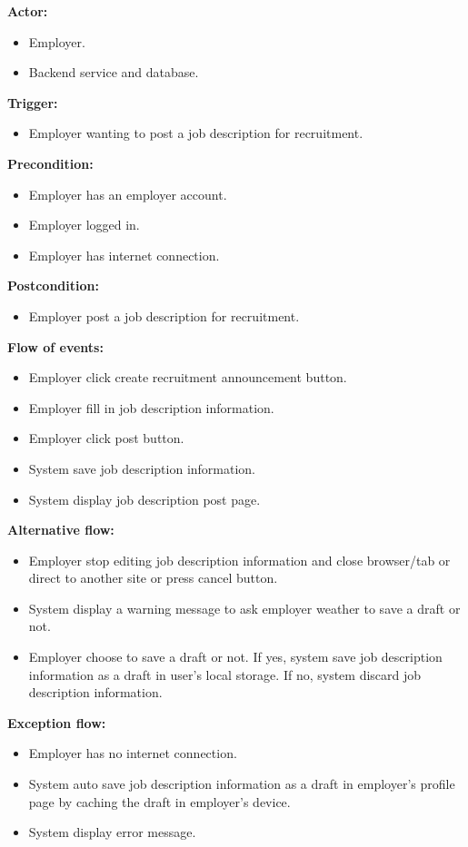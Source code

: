 \documentclass[a4paper]{article}
\begin{document}
\textbf{Actor:}
\begin{itemize}
  \item Employer.
  \item Backend service and database.
\end{itemize}

\textbf{Trigger:}
\begin{itemize}
  \item Employer wanting to post a job description for recruitment.
\end{itemize}

\textbf{Precondition:}
\begin{itemize}
  \item Employer has an employer account.
  \item Employer logged in.
  \item Employer has internet connection.
\end{itemize}

\textbf{Postcondition:}
\begin{itemize}
  \item Employer post a job description for recruitment.
\end{itemize}

\textbf{Flow of events:}
\begin{itemize}
  \item Employer click create recruitment announcement button.
  \item Employer fill in job description information.
  \item Employer click post button.
  \item System save job description information.
  \item System display job description post page.
\end{itemize}

\textbf{Alternative flow:}
\begin{itemize}
  \item Employer stop editing job description information and close browser/tab or direct to another site or press cancel button.
  \item System display a warning message to ask employer weather to save a draft or not.
  \item Employer choose to save a draft or not. If yes, system save job description information as a draft in user's local storage. If no, system discard job description information.
\end{itemize}

\textbf{Exception flow:}
\begin{itemize}
  \item Employer has no internet connection.
  \item System auto save job description information as a draft in employer's profile page by caching the draft in employer's device.
  \item System display error message.
\end{itemize}
\end{document}
